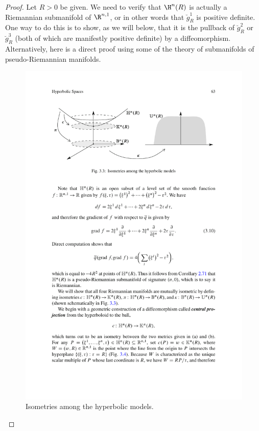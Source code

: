 \begin{proof}
Let $R>0$ be given. We need to verify that $\H^n(R)$ is actually a Riemannian submanifold of 
$\R^{n,1}$, or in other words that $\breve{g}^1_R$ is positive definite. One way to do this 
is to show, as we will below, that it is the pullback of $\breve{g}^2_R$ or $\breve{g}^3_R$ 
(both of which are manifestly positive definite) by a diffeomorphism. Alternatively, here 
is a direct proof using some of the theory of submanifolds of pseudo-Riemannian manifolds.
\begin{figure}[htbp]
\centering
\includegraphics{pictures/hyperbolic-model}
\caption{Isometries among the hyperbolic models.}
\end{figure}


\end{proof}
